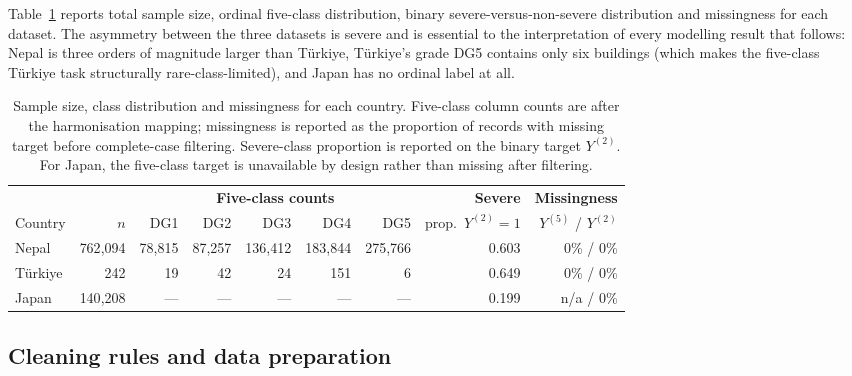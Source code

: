 \documentclass[11pt,a4paper]{article}
\newcommand{\Y}{\ensuremath{Y}}
\begin{document}
Table~\ref{tab:samples} reports total sample size, ordinal five-class distribution, binary severe-versus-non-severe distribution and missingness for each dataset. The asymmetry between the three datasets is severe and is essential to the interpretation of every modelling result that follows: Nepal is three orders of magnitude larger than T\"urkiye, T\"urkiye's grade DG5 contains only six buildings (which makes the five-class T\"urkiye task structurally rare-class-limited), and Japan has no ordinal label at all.

\begin{table}[!t]
\centering
\caption{Sample size, class distribution and missingness for each country. Five-class column counts are after the harmonisation mapping; missingness is reported as the proportion of records with missing target before complete-case filtering. Severe-class proportion is reported on the binary target $\Y^{(2)}$. For Japan, the five-class target is unavailable by design rather than missing after filtering.}
\label{tab:samples}
\small
\begin{tabular}{l r r r r r r r r}
\toprule
& & \multicolumn{5}{c}{\textbf{Five-class counts}} & \textbf{Severe} & \textbf{Missingness} \\
\cmidrule(lr){3-7}
Country & $n$ & DG1 & DG2 & DG3 & DG4 & DG5 & prop.\ $\Y^{(2)}{=}1$ & $\Y^{(5)}$ / $\Y^{(2)}$ \\
\midrule
Nepal     & 762{,}094 & 78{,}815 & 87{,}257 & 136{,}412 & 183{,}844 & 275{,}766 & 0.603 & 0\% / 0\% \\
T\"urkiye & 242       & 19       & 42       & 24        & 151       & 6         & 0.649 & 0\% / 0\% \\
Japan     & 140{,}208 & ---      & ---      & ---       & ---       & ---       & 0.199 & n/a / 0\% \\
\bottomrule
\end{tabular}
\end{table}

\subsection{Cleaning rules and data preparation}
\label{sec:data-cleaning}
\end{document}
